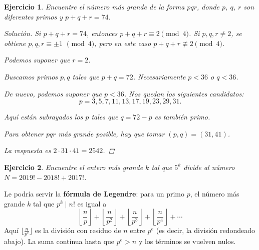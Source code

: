 \documentclass{article}
\theoremstyle{plain}
\newtheorem{ejercicio}{Ejercicio}
\newenvironment{solucion}{\begin{proof}[Solución]}{\end{proof}}
\begin{document}
\begin{ejercicio}
Encuentre el número más grande de la forma $pqr$, donde
$p$, $q$, $r$ son diferentes primos y $p + q + r = 74$.

\ifdefined\solutions
\begin{solucion}
    Si $p + q + r = 74$, entonces
    $p + q + r \equiv 2 \pmod{4}$.
    Si $p, q, r \ne 2$, se obtiene $p,q,r \equiv \pm 1$ $\pmod{4}$,
    pero en este caso $p + q + r \not\equiv 2 \pmod{4}$.

    Podemos suponer que $r = 2$.

    Buscamos primos $p, q$ tales que $p + q = 72$.
    Necesariamente $p < 36$ o $q < 36$.

    De nuevo, podemos suponer que $p < 36$. Nos quedan los siguientes candidatos:
    \[ p = 3, \boxed{5}, 7, \boxed{11}, \boxed{13}, 17, \boxed{19}, 23, \boxed{29}, \boxed{31}. \]

    Aquí están subrayados los $p$ tales que $q = 72 - p$ es también primo.

    Para obtener $pqr$ más grande posible, hay que tomar $(p,q) = (31,41)$.

    La respuesta es $2\cdot 31\cdot 41 = 2542$.
\end{solucion}
\fi
\end{ejercicio}

\pagebreak

\begin{ejercicio}
Encuentre el entero más grande $k$ tal que $5^k$ divide al número
$N = 2019! - 2018! + 2017!$.
\end{ejercicio}

Le podría servir la \textbf{fórmula de Legendre}: para un primo $p$,
el número más grande $k$ tal que $p^k \mid n!$ es igual a
\[
    \left\lfloor\frac{n}{p}\right\rfloor +
    \left\lfloor\frac{n}{p^2}\right\rfloor +
    \left\lfloor\frac{n}{p^3}\right\rfloor +
    \left\lfloor\frac{n}{p^4}\right\rfloor +
    \cdots
\]
Aquí $\lfloor\frac{n}{p^e}\rfloor$ es la división con residuo de $n$ entre $p^e$
(es decir, la división redondeado abajo). La suma continua hasta que $p^e > n$
y los términos se vuelven nulos.
\end{document}

